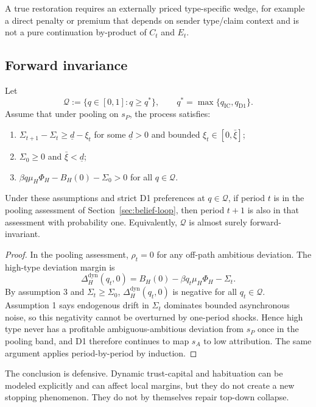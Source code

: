 A true restoration requires an externally priced type-specific wedge, for example a direct penalty or premium that depends on sender type/claim context and is not a pure continuation by-product of $C_t$ and $E_t$.

\subsection{Forward invariance}

Let
\[
\mathcal Q:=\{q\in[0,1]: q\ge q^*\},
\qquad q^*=\max\{q_{\mathrm{IC}},q_{\mathrm{D1}}\}.
\]
Assume that under pooling on $s_P$, the process satisfies:
\begin{enumerate}
\item $\Sigma_{t+1}-\Sigma_t\ge \underline d-\xi_t$ for some $\underline d>0$ and bounded $\xi_t\in[0,\bar\xi]$;
\item $\Sigma_0\ge 0$ and $\bar\xi<\underline d$;
\item $\beta q\mu_H\Phi_H-B_H(0)-\Sigma_0>0$ for all $q\in\mathcal Q$.
\end{enumerate}

\begin{theorem}
\label{thm:forward-invariance}
Under these assumptions and strict D1 preferences at $q\in\mathcal Q$, if period $t$ is in the pooling assessment of Section~\ref{sec:belief-loop}, then period $t+1$ is also in that assessment with probability one. Equivalently, $\mathcal Q$ is almost surely forward-invariant.
\end{theorem}

\begin{proof}
In the pooling assessment, $\rho_t=0$ for any off-path ambitious deviation. The high-type deviation margin is
\[
\Delta_H^{\text{dyn}}(q_t,0)=B_H(0)-\beta q_t\mu_H\Phi_H-\Sigma_t.
\]
By assumption 3 and $\Sigma_t\ge \Sigma_0$, $\Delta_H^{\text{dyn}}(q_t,0)$ is negative for all $q_t\in\mathcal Q$. Assumption 1 says endogenous drift in $\Sigma_t$ dominates bounded asynchronous noise, so this negativity cannot be overturned by one-period shocks.
Hence high type never has a profitable ambiguous-ambitious deviation from $s_P$ once in the pooling band, and D1 therefore continues to map $s_A$ to low attribution. The same argument applies period-by-period by induction.
\end{proof}

The conclusion is defensive. Dynamic trust-capital and habituation can be modeled explicitly and can affect local margins, but they do not create a new stopping phenomenon. They do not by themselves repair top-down collapse.
